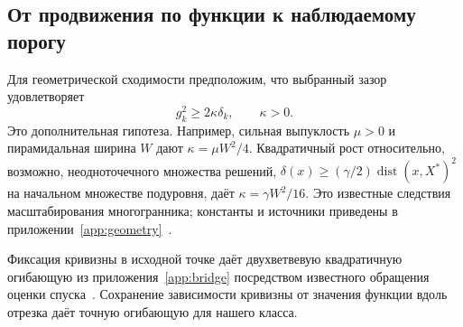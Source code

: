 \subsection{От продвижения по функции к наблюдаемому порогу}
Для геометрической сходимости предположим, что выбранный зазор
удовлетворяет
\begin{equation}\label{eq:geometry}
 g_k^2\ge2\kappa\delta_k,\qquad\kappa>0.
\end{equation}
Это дополнительная гипотеза. Например, сильная выпуклость $\mu>0$
и пирамидальная ширина $W$ дают $\kappa=\mu W^2/4$.
Квадратичный рост относительно, возможно, неодноточечного множества
решений, $\delta(x)\ge(\gamma/2)\operatorname{dist}(x,X^*)^2$ на
начальном множестве подуровня, даёт $\kappa=\gamma W^2/16$.
Это известные следствия масштабирования многогранника; константы и
источники приведены в приложении~\ref{app:geometry}~\cite{lacostejaggi,restartfw}.

Фиксация кривизны в исходной точке даёт двухветвевую квадратичную
огибающую из приложения~\ref{app:bridge} посредством известного
обращения оценки спуска~\cite[формула (15)]{lacoste2016}.
Сохранение зависимости кривизны от значения функции вдоль отрезка
даёт точную огибающую для нашего класса.

